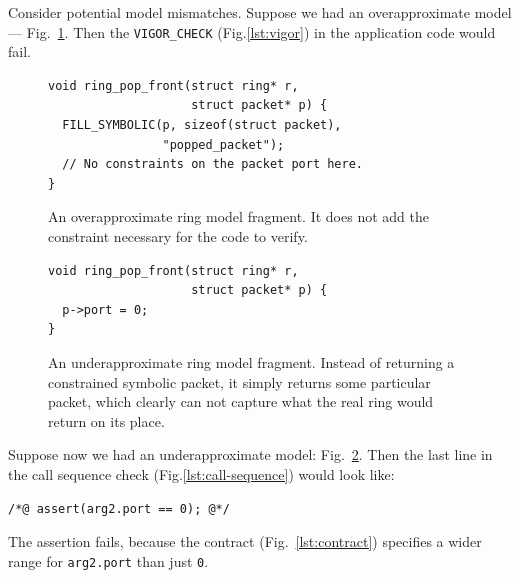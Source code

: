 \documentclass[letterpaper,twocolumn,10pt]{article}
\newcommand{\code}[1]{\lstinline{#1}}
\begin{document}
Consider potential model mismatches. Suppose we had an overapproximate model ---
Fig.~\ref{lst:overapproximate}. Then the \code{VIGOR_CHECK}
(Fig.\ref{lst:vigor}) in the application code would fail.
\begin{figure}[h!]
\begin{lstlisting}
void ring_pop_front(struct ring* r,
                    struct packet* p) {
  FILL_SYMBOLIC(p, sizeof(struct packet),
                "popped_packet");
  // No constraints on the packet port here.
}
\end{lstlisting}
  \caption{An overapproximate ring model fragment. It does not add the
    constraint necessary for the code to verify.}
  \label{lst:overapproximate}
\end{figure}

\begin{figure}[h!]
\begin{lstlisting}
void ring_pop_front(struct ring* r,
                    struct packet* p) {
  p->port = 0;
}
\end{lstlisting}
  \caption{An underapproximate ring model fragment. Instead of returning a
    constrained symbolic packet, it simply returns some particular packet, which
    clearly can not capture what the real ring would return on its place.}
  \label{lst:underapproximate}
\end{figure}

Suppose now we had an underapproximate model: Fig.~\ref{lst:underapproximate}.
Then the last line in the call sequence check (Fig.\ref{lst:call-sequence}) would look like:
\begin{lstlisting}
/*@ assert(arg2.port == 0); @*/
\end{lstlisting}
The assertion fails, because the contract (Fig.~\ref{lst:contract}) specifies
a wider range for \code{arg2.port} than just \code{0}.


\end{document}
